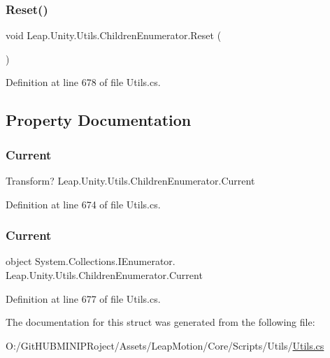 \subsubsection{\texorpdfstring{Reset()}{Reset()}}
{\footnotesize\ttfamily void Leap.\+Unity.\+Utils.\+Children\+Enumerator.\+Reset (\begin{DoxyParamCaption}{ }\end{DoxyParamCaption})}



Definition at line 678 of file Utils.\+cs.



\subsection{Property Documentation}
\mbox{\label{struct_leap_1_1_unity_1_1_utils_1_1_children_enumerator_a68c62e8621daa51abec5138c359c2534}} 
\subsubsection{\texorpdfstring{Current}{Current}\hspace{0.1cm}{\footnotesize\ttfamily [1/2]}}
{\footnotesize\ttfamily Transform? Leap.\+Unity.\+Utils.\+Children\+Enumerator.\+Current\hspace{0.3cm}{\ttfamily [get]}}



Definition at line 674 of file Utils.\+cs.

\mbox{\label{struct_leap_1_1_unity_1_1_utils_1_1_children_enumerator_a831a35b2ce2e021c05df7af0d66cac80}} 
\subsubsection{\texorpdfstring{Current}{Current}\hspace{0.1cm}{\footnotesize\ttfamily [2/2]}}
{\footnotesize\ttfamily object System.\+Collections.\+I\+Enumerator. Leap.\+Unity.\+Utils.\+Children\+Enumerator.\+Current\hspace{0.3cm}{\ttfamily [get]}}



Definition at line 677 of file Utils.\+cs.



The documentation for this struct was generated from the following file\+:\begin{DoxyCompactItemize}
\item 
O\+:/\+Git\+H\+U\+B\+M\+I\+N\+I\+P\+Roject/\+Assets/\+Leap\+Motion/\+Core/\+Scripts/\+Utils/\mbox{\hyperlink{_utils_8cs}{Utils.\+cs}}\end{DoxyCompactItemize}

